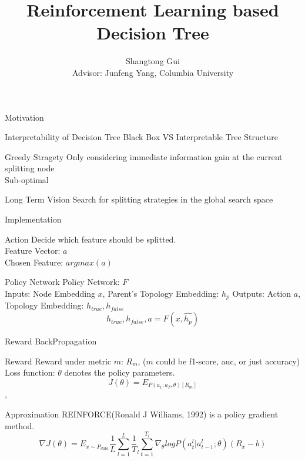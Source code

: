 \documentclass{beamer}
\title{Reinforcement Learning based Decision Tree}
\author{Shangtong Gui\\Advisor: Junfeng Yang, Columbia University}
\begin{document}
\begin{frame}[plain]
    \maketitle
\end{frame}

\begin{frame}{Motivation}
	\begin{block}{Interpretability of Decision Tree}
		Black Box VS Interpretable Tree Structure
	\end{block}
	\begin{block}{Greedy Stragety}
		Only considering immediate information gain at the current splitting node\\
		Sub-optimal
	\end{block}
	\begin{block}{Long Term Vision}
		Search for splitting strategies in the global search space
	\end{block}
\end{frame}

\begin{frame}{Implementation}
	\begin{block}{Action}
		Decide which feature should be splitted.\\
		Feature Vector: $a$\\
		Chosen Feature: $argmax(a)$
	\end{block}
	\begin{block}{Policy Network}
		Policy Network: $F$\\
		Inputs: Node Embedding $x$, Parent's Topology Embedding: $h_p$
		Outputs: Action $a$, Topology Embedding: $h_{true},h_{false}$\\
		$$h_{true},h_{false},a = F(x,\hat{h_p})$$
	\end{block}
\end{frame}

\begin{frame}{Reward BackPropagation}
	
	\begin{block}{Reward}
		Reward under metric $m$: $R_m$, ($m$ could be f1-score, auc, or just accuracy)\\
		Loss function: $\theta$ denotes the policy parameters.\\
		$$J(\theta) = E_{P(a_1:a_T,\theta)[R_m]}$$,
	\end{block}
	 
	\begin{block}{Approximation}
		REINFORCE(Ronald J Williams, 1992) is a policy gradient method.\\
		$$
		\nabla J(\theta) = 
		E_{x\sim P_{data}}\frac 1 L  \sum_{l=1}^L \frac 1 T_l \sum_{t=1}^{T_l} \nabla_\theta log P(a_t^l|a_{t-1}^l;\theta)(R_x - b)
		$$
	\end{block}

	
\end{frame}
\end{document}
